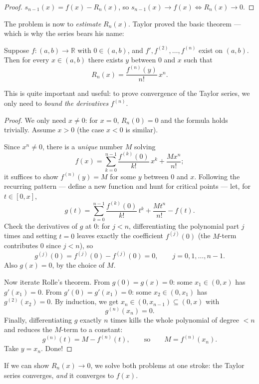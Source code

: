 \documentclass[11pt]{report}
\begin{document}
\begin{proof}
$s_{n-1}(x) = f(x) - R_n(x)$, so $s_{n-1}(x) \to f(x) \iff R_n(x) \to 0$.
\end{proof}

The problem is now to \emph{estimate} $R_n(x)$. Taylor proved the basic theorem --- which is why the series bears his name:

\begin{thmbox}
Suppose $f: (a,b) \to \mathbb{R}$ with $0 \in (a,b)$, and $f', f^{(2)}, \ldots, f^{(n)}$ exist on $(a,b)$. Then for every $x \in (a,b)$ there exists $y$ between $0$ and $x$ such that
\[
R_n(x) = \frac{f^{(n)}(y)}{n!}\, x^n.
\]
\end{thmbox}

This is quite important and useful: to prove convergence of the Taylor series, we only need to \emph{bound the derivatives} $f^{(n)}$.

\begin{proof}
We only need $x \neq 0$: for $x = 0$, $R_n(0) = 0$ and the formula holds trivially. Assume $x > 0$ (the case $x < 0$ is similar).

Since $x^n \neq 0$, there is a \emph{unique} number $M$ solving
\[
f(x) = \sum_{k=0}^{n-1} \frac{f^{(k)}(0)}{k!}\, x^k + \frac{M x^n}{n!};
\]
it suffices to show $f^{(n)}(y) = M$ for some $y$ between $0$ and $x$. Following the recurring pattern --- define a new function and hunt for critical points --- let, for $t \in [0, x]$,
\[
g(t) = \sum_{k=0}^{n-1} \frac{f^{(k)}(0)}{k!}\, t^k + \frac{M t^n}{n!} - f(t).
\]
Check the derivatives of $g$ at $0$: for $j < n$, differentiating the polynomial part $j$ times and setting $t = 0$ leaves exactly the coefficient $f^{(j)}(0)$ (the $M$-term contributes $0$ since $j < n$), so
\[
g^{(j)}(0) = f^{(j)}(0) - f^{(j)}(0) = 0, \qquad j = 0, 1, \ldots, n-1.
\]
Also $g(x) = 0$, by the choice of $M$.

Now iterate Rolle's theorem. From $g(0) = g(x) = 0$: some $x_1 \in (0, x)$ has $g'(x_1) = 0$. From $g'(0) = g'(x_1) = 0$: some $x_2 \in (0, x_1)$ has $g^{(2)}(x_2) = 0$. By induction, we get $x_n \in (0, x_{n-1}) \subseteq (0, x)$ with
\[
g^{(n)}(x_n) = 0.
\]
Finally, differentiating $g$ exactly $n$ times kills the whole polynomial of degree $< n$ and reduces the $M$-term to a constant:
\[
g^{(n)}(t) = M - f^{(n)}(t), \qquad \text{so} \qquad M = f^{(n)}(x_n).
\]
Take $y = x_n$. Done!
\end{proof}

\begin{rembox}
If we can show $R_n(x) \to 0$, we solve both problems at one stroke: the Taylor series converges, \emph{and} it converges to $f(x)$.
\end{rembox}
\end{document}
